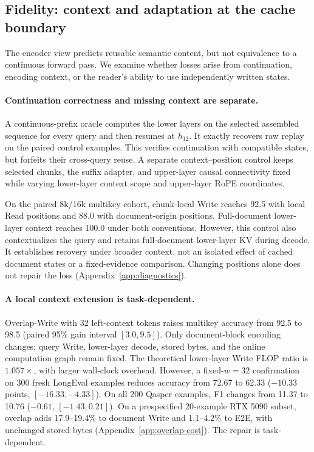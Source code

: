 \subsection{Fidelity: context and adaptation at the cache boundary}
\label{sec:diagnosis}
The encoder view predicts reusable semantic content, but not equivalence to a continuous forward pass. We examine whether losses arise from continuation, encoding context, or the reader's ability to use independently written states.
\paragraph{Continuation correctness and missing context are separate.}
A continuous-prefix oracle computes the lower layers on the selected assembled sequence for every query and then resumes at $h_{12}$. It exactly recovers raw replay on the paired control examples. This verifies continuation with compatible states, but forfeits their cross-query reuse. A separate context--position control keeps selected chunks, the suffix adapter, and upper-layer causal connectivity fixed while varying lower-layer context scope and upper-layer RoPE coordinates.

On the paired 8k/16k multikey cohort, chunk-local Write reaches 92.5 with local Read positions and 88.0 with document-origin positions. Full-document lower-layer context reaches 100.0 under both conventions. However, this control also contextualizes the query and retains full-document lower-layer KV during decode. It establishes recovery under broader context, not an isolated effect of cached document states or a fixed-evidence comparison. Changing positions alone does not repair the loss (Appendix~\ref{app:diagnostics}).

\paragraph{A local context extension is task-dependent.}
Overlap-Write with 32 left-context tokens raises multikey accuracy from 92.5 to 98.5 (paired 95\% gain interval $[3.0,9.5]$). Only document-block encoding changes; query Write, lower-layer decode, stored bytes, and the online computation graph remain fixed. The theoretical lower-layer Write FLOP ratio is $1.057\times$, with larger wall-clock overhead. However, a fixed-$w=32$ confirmation on 300 fresh LongEval examples reduces accuracy from 72.67 to 62.33 ($-10.33$ points, $[-16.33,-4.33]$). On all 200 Qasper examples, F1 changes from 11.37 to 10.76 ($-0.61$, $[-1.43,0.21]$). On a prespecified 20-example RTX 5090 subset, overlap adds 17.9--19.4\% to document Write and 1.1--4.2\% to E2E, with unchanged stored bytes (Appendix~\ref{app:overlap-cost}). The repair is task-dependent.

